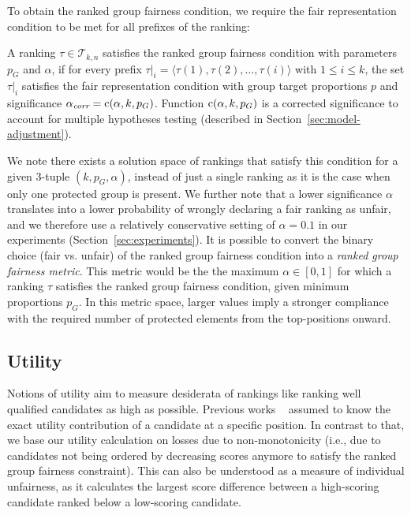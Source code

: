 To obtain the ranked group fairness condition, we require the fair representation condition to be met for all prefixes of the ranking:

\begin{definition}
	\label{def:ranked-group-fairness-condition}
	A ranking $\tau \in {\mathcal T}_{k,n}$ satisfies the ranked group fairness condition with parameters $p_G$ and $\alpha$, if for every prefix $\tau|_i = \langle \tau(1), \tau(2), \dots, \tau(i) \rangle$ with $1 \le i \le k$, the set $\tau|_i$ satisfies the fair representation condition with group target proportions $p$ and significance $\alpha_\textit{corr} = \operatorname{c}(\alpha, k, p_G)$.
	Function $\operatorname{c}(\alpha, k, p_G)$ is a corrected significance to account for multiple hypotheses testing (described in Section~\ref{sec:model-adjustment}).
\end{definition}

We note there exists a solution space of rankings that satisfy this condition for a given 3-tuple $(k, p_G, \alpha)$, instead of just a single ranking as it is the case when only one protected group is present.
%
We further note that a lower significance $\alpha$ translates into a lower probability of wrongly declaring a fair ranking as unfair, and we therefore use a relatively conservative setting of $\alpha=0.1$ in our experiments (Section~\ref{sec:experiments}).
%
It is possible to convert the binary choice (fair vs. unfair) of the ranked group fairness condition into a \emph{ranked group fairness metric}. This metric would be the the maximum $\alpha \in [0,1]$ for which a ranking $\tau$ satisfies the ranked group fairness condition, given minimum proportions $p_G$.
%
In this metric space, larger values imply a stronger compliance with the required number of protected elements from the top-positions onward.

\subsection{Utility}
\label{subsec:individual-fairness}
Notions of utility aim to measure desiderata of rankings like ranking well qualified candidates as high as possible.
%
Previous works ~\cite{yang2016measuring,celis2017ranking} assumed to know the exact utility contribution of a candidate at a specific position. In contrast to that, we base our utility calculation on losses due to non-monotonicity (i.e., due to candidates not being ordered by decreasing scores anymore to satisfy the ranked group fairness constraint).
%
This can also be understood as a measure of individual unfairness, as it calculates the largest score difference between a high-scoring candidate ranked below a low-scoring candidate.

